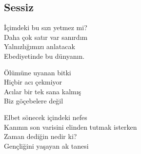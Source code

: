 \subsection{Sessiz}

İçimdeki bu sızı yetmez mi?  \\
Daha çok satır var sanırdım  \\
Yalnızlığımızı anlatacak \\
Ebediyetinde bu dünyanın.

\noindent\newline
Ölümüne uyanan bitki \\
Hiçbir acı çekmiyor \\
Acılar bir tek sana kalmış \\
Biz göçebelere değil

\noindent\newline
Elbet sönecek içindeki nefes \\
Kanının son varisini elinden tutmak isterken \\
Zaman dediğin nedir ki? \\
Gençliğini yaşayan ak tanesi
